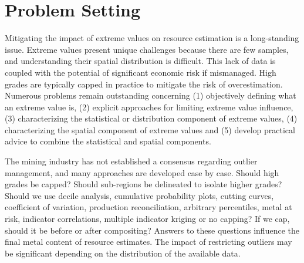 

\FloatBarrier
\section{Problem Setting}
\label{sec:01problem}

Mitigating the impact of extreme values on resource estimation is a long-standing issue. Extreme values present unique challenges because there are few samples, and understanding their spatial distribution is difficult. This lack of data is coupled with the potential of significant economic risk if mismanaged. High grades are typically capped in practice to mitigate the risk of overestimation. Numerous problems remain outstanding concerning (1) objectively defining what an extreme value is, (2) explicit approaches for limiting extreme value influence, (3) characterizing the statistical or distribution component of extreme values, (4) characterizing the spatial component of extreme values and (5) develop practical advice to combine the statistical and spatial components.

The mining industry has not established a consensus regarding outlier management, and many approaches are developed case by case. Should high grades be capped? Should sub-regions be delineated to isolate higher grades? Should we use decile analysis, cumulative probability plots, cutting curves, coefficient of variation, production reconciliation, arbitrary percentiles, metal at risk, indicator correlations, multiple indicator kriging or no capping? If we cap, should it be before or after compositing? Answers to these questions influence the final metal content of resource estimates. The impact of restricting outliers may be significant depending on the distribution of the available data.

